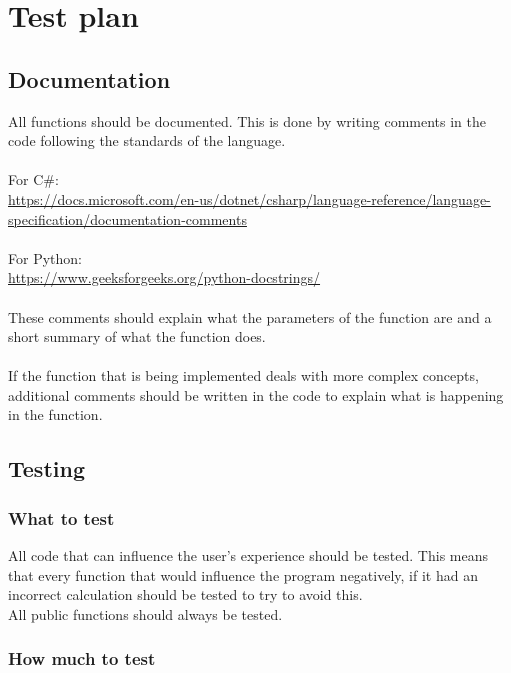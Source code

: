 \section{Test plan}

\subsection{Documentation}
All functions should be documented. 
This is done by writing comments in the code following the standards of the language.
\\\\
For C\#: 
\\
\url{https://docs.microsoft.com/en-us/dotnet/csharp/language-reference/language-specification/documentation-comments}
\\\\
For Python:
\\
\url{https://www.geeksforgeeks.org/python-docstrings/}
\\\\
These comments should explain what the parameters of the function are and a short summary of what the function does.
\\\\
If the function that is being implemented deals with more complex concepts, additional comments should be written in the code to explain what is happening in the function.

\subsection{Testing}
\subsubsection{What to test}
All code that can influence the user's experience should be tested. 
This means that every function that would influence the program negatively, if it had an incorrect calculation should be tested to try to avoid this.
\\
All public functions should always be tested.

\subsubsection{How much to test}

